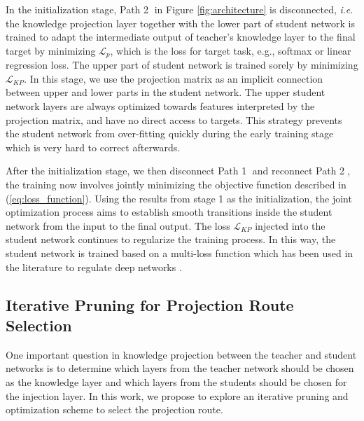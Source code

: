 \documentclass[journal]{IEEEtran}
\newcommand{\ie}{\textit{i}.\textit{e}. }
\begin{document}
In the initialization stage, Path \textcircled{2} in Figure \ref{fig:architecture} is disconnected, \ie the knowledge projection layer together with the lower part of student network is trained to adapt the intermediate output of teacher's knowledge layer to the final target by minimizing $\mathcal{L}_p$, which is the loss for target task, e.g., softmax or linear regression loss.  The upper part of student network is trained sorely by minimizing $\mathcal{L}_{KP}$. In this stage, we use the projection matrix as an implicit connection between upper and lower parts in the student network. The upper student network layers are always optimized towards features interpreted by the projection matrix, and have no direct access to targets. This strategy prevents the student network from over-fitting quickly during the early training stage which is very hard to correct afterwards.

After the initialization stage, we then disconnect Path \textcircled{1} and reconnect Path \textcircled{2}, the training now involves jointly minimizing the objective function described in (\ref{eq:loss_function}). 
Using the results from stage 1 as the initialization, the joint optimization process aims to establish smooth transitions inside the student network from the input to the final output. The loss $\mathcal{L}_{KP}$ injected into the student network continues to regularize the training process. In this way, the student network is trained based on a multi-loss function which has been used in the literature to regulate deep networks \cite{xu2016multi}.

\subsection{Iterative Pruning for Projection Route Selection}
One important question in knowledge projection between the teacher and student networks is to determine which layers from the teacher network should be chosen as the knowledge layer and which layers from the students should be chosen for the injection layer. In this work, we propose to explore an iterative pruning and optimization scheme to select the projection route.
\end{document}
